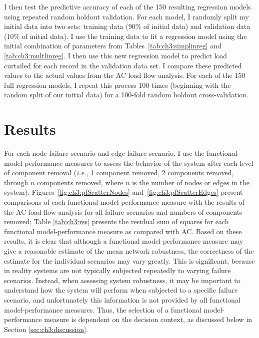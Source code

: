 
I then test the predictive accuracy of each of the 150 resulting regression models using repeated random holdout validation.  For each model, I randomly split my initial data into two sets: training data (90\% of initial data) and validation data (10\% of initial data). I use the training data to fit a regression model using the initial combination of parameters from Tables~\ref{tab:ch3:simplinreg} and \ref{tab:ch3:multlinreg}. I then use this new regression model to predict load curtailed for each record in the validation data set.  I compare these predicted values to the actual values from the AC load flow analysis. For each of the 150 full regression models, I repeat this process 100 times (beginning with the random split of our initial data) for a 100-fold random holdout cross-validation.


\section{Results}
\label{sec:ch3:results}

For each node failure scenario and edge failure scenario, I use the functional model-performance measures to assess the behavior of the system after each level of component removal (\emph{i.e.}, 1 component removed, 2 components removed, through $n$ components removed, where $n$ is the number of nodes or edges in the system).  Figures~\ref{fig:ch3:pfScatterNodes} and~\ref{fig:ch3:pfScatterEdges} present comparisons of each functional model-performance measure with the results of the AC load flow analysis for all failure scenarios and numbers of components removed; Table \ref{tab:ch3:rss} presents the residual sum of squares for each functional model-performance measure as compared with AC. Based on these results, it is clear that although a functional model-performance measure may give a reasonable estimate of the mean network robustness, the correctness of the estimate for the individual scenarios may vary greatly. This is significant, because in reality systems are not typically subjected repeatedly to varying failure scenarios. Instead, when assessing system robustness, it may be important to understand how the system will perform when subjected to a specific failure scenario, and unfortunately this information is not provided by all functional model-performance measures. Thus, the selection of a functional model-performance measure is dependent on the decision context, as discussed below in Section \ref{sec:ch3:discussion}.

